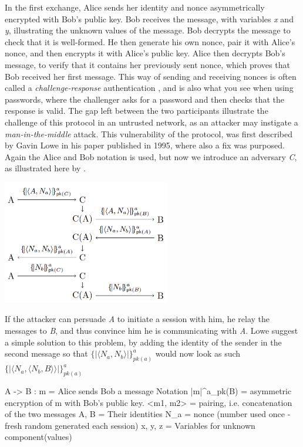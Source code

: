 In the first exchange, Alice sends her identity and nonce asymmetrically encrypted with Bob's public key. Bob receives the message, with variables \textit{x} and \textit{y}, illustrating the unknown values of the message. Bob decrypts the message to check that it is well-formed. He then generate his own nonce, pair it with Alice's nonce, and then encrypts it with Alice's public key. Alice then decrypts Bob's message, to verify that it contains her previously sent nonce, which proves that Bob received her first message. 
This way of sending and receiving nonces is often called a \textit{challenge-response} authentication \autocite{DBLP:journals/ftpl/CortierK14}, and is also what you see when using passwords, where the challenger asks for a password and then checks that the response is valid. 
\bigbreak
The gap left between the two participants illustrate the challenge of this protocol in an untrusted network, as an attacker may instigate a \textit{man-in-the-middle} attack. This vulnerability of the protocol, was first described by Gavin Lowe in his paper published in 1995, where also a fix was purposed. Again the Alice and Bob notation is used, but now we introduce an adversary \textit{C}, as illustrated here by \citeauthor{DBLP:journals/ftpl/CortierK14}.

\begin{center}
\includegraphics[width=0.55\textwidth, angle=0]{Graphics/Challenge.pdf}
\end{center}

If the attacker can persuade \textit{A} to initiate a session with him, he relay the messages to \textit{B}, and thus convince him he is communicating with \textit{A}. Lowe suggest a simple solution to this problem, by adding the identity of the sender in the second message so that $\{|\langle N_a, N_b\rangle |\}^a_{pk(a)}$ would now look as such $\{|\langle N_a, \langle N_b, B\rangle \rangle |\}^a_{pk(a)}$


\iffalse
A -> B : m  			= Alice sends Bob a message
Notation {|m|}^a_pk(B) 	= asymmetric encryption of m with Bob's public key. 
<m1, m2>				= pairing, i.e. concatenation of the two messages
A, B					= Their identities
N_a					= nonce (number used once - fresh random generated each session)
x, y, z				= Variables for unknown component(values)

